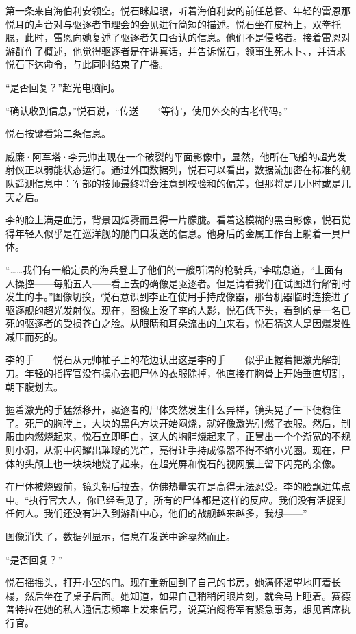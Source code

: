 \documentclass[AutoFakeBold=true]{book}
\begin{document}
第一条来自海伯利安领空。悦石眯起眼，听着海伯利安的前任总督、年轻的雷恩那悦耳的声音对与驱逐者审理会的会见进行简短的描述。悦石坐在皮椅上，双拳托腮，此时，雷恩向她复述了驱逐者矢口否认的信息。他们不是侵略者。接着雷恩对游群作了概述，他觉得驱逐者是在讲真话，并告诉悦石，领事生死未卜、，并请求悦石下达命令，与此同时结束了广播。

``是否回复？''超光电脑问。

``确认收到信息，''悦石说，``传送——`等待'，使用外交的古老代码。''

悦石按键看第二条信息。

威廉·阿军塔·李元帅出现在一个破裂的平面影像中，显然，他所在飞船的超光发射仪正以弱能状态运行。通过外围数据列，悦石可以看出，数据流加密在标准的舰队遥测信息中：军部的技师最终将会注意到校验和的偏差，但那将是几小时或是几天之后。

李的脸上满是血污，背景因烟雾而显得一片朦胧。看着这模糊的黑白影像，悦石觉得年轻人似乎是在巡洋舰的舱门口发送的信息。他身后的金属工作台上躺着一具尸体。

``……我们有一船定员的海兵登上了他们的一艘所谓的枪骑兵，''李喘息道，``上面有人操控——每船五人——看上去的确像是驱逐者。但是请看我们在试图进行解剖时发生的事。''图像切换，悦石意识到李正在使用手持成像器，那台机器临时连接进了驱逐舰的超光发射仪。现在，图像上没了李的人影，悦石低下头，看到的是一名已死的驱逐者的受损苍白之脸。从眼睛和耳朵流出的血来看，悦石猜这人是因爆发性减压而死的。

李的手——悦石从元帅袖子上的花边认出这是李的手——似乎正握着把激光解剖刀。年轻的指挥官没有操心去把尸体的衣服除掉，他直接在胸骨上开始垂直切割，朝下腹划去。

握着激光的手猛然移开，驱逐者的尸体突然发生什么异样，镜头晃了一下便稳住了。死尸的胸膛上，大块的黑色方块开始闷烧，就好像激光引燃了衣服。然后，制服由内燃烧起来，悦石立即明白，这人的胸脯烧起来了，正冒出一个个渐宽的不规则小洞，从洞中闪耀出璀璨的光芒，亮得让手持成像器不得不缩小光圈。现在，尸体的头颅上也一块块地烧了起来，在超光屏和悦石的视网膜上留下闪亮的余像。

在尸体被烧毁前，镜头朝后拉去，仿佛热量实在是高得无法忍受。李的脸飘进焦点中。``执行官大人，你已经看见了，所有的尸体都是这样的反应。我们没有活捉到任何人。我们还没有进入到游群中心，他们的战舰越来越多，我想——''

图像消失了，数据列显示，信息在发送中途戛然而止。

``是否回复？''

悦石摇摇头，打开小室的门。现在重新回到了自己的书房，她满怀渴望地盯着长榻，然后坐在了桌子后面。她知道，如果自己稍稍闭眼片刻，就会马上睡着。赛德普特拉在她的私人通信志频率上发来信号，说莫泊阁将军有紧急事务，想见首席执行官。
\end{document}
